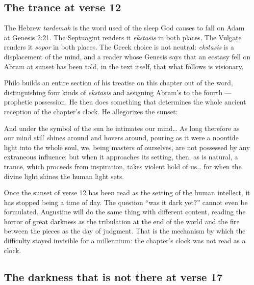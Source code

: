 \subsection{The trance at verse 12}

The Hebrew \textit{tardemah} is the word used of the sleep God causes to fall on
Adam at Genesis 2:21. The Septuagint renders it \textit{ekstasis} in both
places. The Vulgate renders it \textit{sopor} in both places. The Greek choice
is not neutral: \textit{ekstasis} is a displacement of the mind, and a reader
whose Genesis says that an ecstasy fell on Abram at sunset has been told, in the
text itself, that what follows is visionary.

Philo builds an entire section of his treatise on this chapter out of the word,
distinguishing four kinds of \textit{ekstasis} and assigning Abram's to the
fourth --- prophetic possession. He then does something that determines the
whole ancient reception of the chapter's clock. He allegorizes the sunset:

\begin{studyframe}
And under the symbol of the sun he intimates our mind\dots{} As long therefore
as our mind still shines around and hovers around, pouring as it were a noontide
light into the whole soul, we, being masters of ourselves, are not possessed by
any extraneous influence; but when it approaches its setting, then, as is
natural, a trance, which proceeds from inspiration, takes violent hold of
us\dots{} for when the divine light shines the human light sets.
\end{studyframe}

Once the sunset of verse 12 has been read as the setting of the human intellect,
it has stopped being a time of day. The question ``was it dark yet?'' cannot
even be formulated. Augustine will do the same thing with different content,
reading the horror of great darkness as the tribulation at the end of the world
and the fire between the pieces as the day of judgment. That is the mechanism by
which the difficulty stayed invisible for a millennium: the chapter's clock was
not read as a clock.

\subsection{The darkness that is not there at verse 17}

